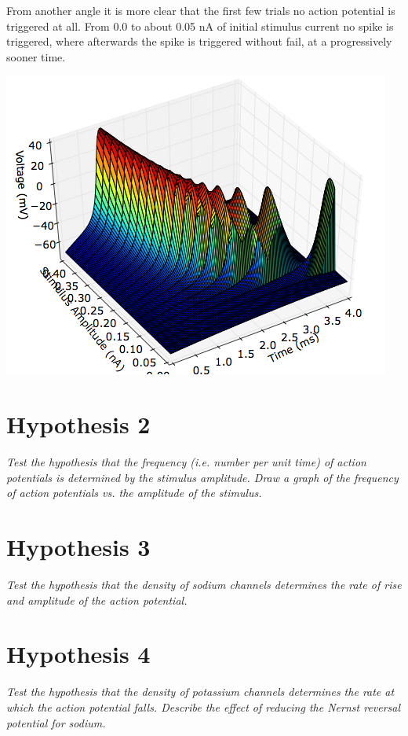 \documentclass[12pt]{article}
\begin{document}
From another angle it is more clear that the first few trials no action potential is triggered at all.  From 0.0 to about 0.05 nA of initial stimulus current no spike is triggered, where afterwards the spike is triggered without fail, at a progressively sooner time.

\includegraphics[scale=0.6]{stimulusamp-side.png}

\section{Hypothesis 2}

\emph{Test the hypothesis that the frequency (i.e. number per unit time) of action potentials is determined by the stimulus amplitude.  Draw a graph of the frequency of action potentials vs. the amplitude of the stimulus.}

\section{Hypothesis 3}

\emph{Test the hypothesis that the density of sodium channels determines the rate of rise and amplitude of the action potential.}

\section{Hypothesis 4}

\emph{Test the hypothesis that the density of potassium channels determines the rate at which the action potential falls.  Describe the effect of reducing the Nernst reversal potential for sodium.}
\end{document}
